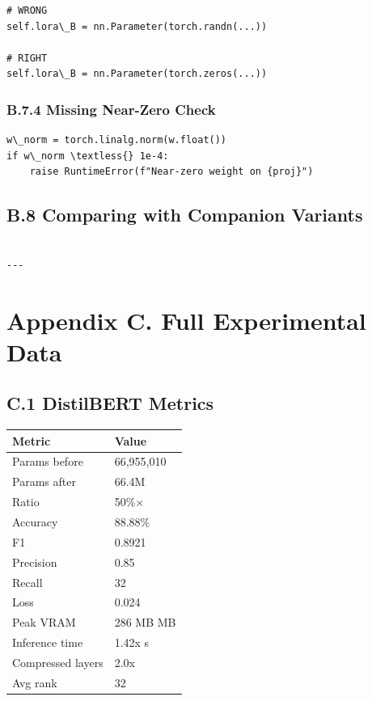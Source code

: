 \begin{lstlisting}
# WRONG
self.lora\_B = nn.Parameter(torch.randn(...))

# RIGHT
self.lora\_B = nn.Parameter(torch.zeros(...))
\end{lstlisting}

\subsubsection{B.7.4 Missing Near-Zero Check}

\begin{lstlisting}
w\_norm = torch.linalg.norm(w.float())
if w\_norm \textless{} 1e-4:
    raise RuntimeError(f"Near-zero weight on {proj}")
\end{lstlisting}

\subsection{B.8 Comparing with Companion Variants}

\begin{lstlisting}

---
\end{lstlisting}


\section{Appendix C. Full Experimental Data}

\subsection{C.1 DistilBERT Metrics}

\begin{table}[H]
\centering
\small
\begin{tabular}{ll}
\toprule
\textbf{Metric} & \textbf{Value} \\
\midrule
Params before & 66,955,010 \\
Params after & 66.4M \\
Ratio & 50\%$\times$ \\
Accuracy & 88.88\% \\
F1 & 0.8921 \\
Precision & 0.85 \\
Recall & 32 \\
Loss & 0.024 \\
Peak VRAM & 286 MB MB \\
Inference time & 1.42x s \\
Compressed layers & 2.0x \\
Avg rank & 32 \\
\bottomrule
\end{tabular}
\end{table}

